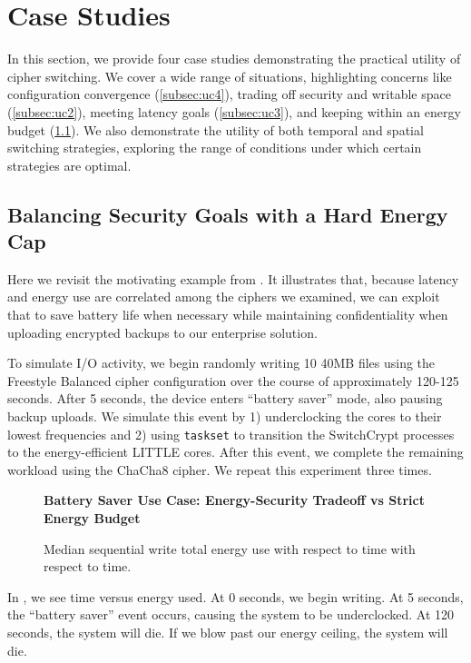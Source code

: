 \section{Case Studies} \label{sec:sc-usecases}

In this section, we provide four case studies demonstrating the practical
utility of cipher switching. We cover a wide range of situations, highlighting
concerns like configuration convergence (\cref{subsec:uc4}), trading off
security and writable space (\cref{subsec:uc2}), meeting latency goals
(\cref{subsec:uc3}), and keeping within an energy budget (\cref{subsec:uc1}). We
also demonstrate the utility of both temporal and spatial switching strategies,
exploring the range of conditions under which certain strategies are optimal.

\subsection{Balancing Security Goals with a Hard Energy Cap} \label{subsec:uc1}

Here we revisit the motivating example from . It illustrates
that, because latency and energy use are correlated among the ciphers we
examined, we can exploit that to save battery life when necessary while
maintaining confidentiality when uploading encrypted backups to our
enterprise solution.

To simulate I/O activity, we begin randomly writing 10 40MB files using the
Freestyle Balanced cipher configuration over the course of approximately 120-125
seconds. After 5 seconds, the device enters ``battery saver'' mode, also pausing
backup uploads. We simulate this event by 1) underclocking the cores to their
lowest frequencies and 2) using \texttt{taskset} to transition the SwitchCrypt
processes to the energy-efficient LITTLE cores. After this event, we complete
the remaining workload using the ChaCha8 cipher. We repeat this experiment three
times.

\begin{figure}[ht] \textbf{Battery Saver Use Case: Energy-Security Tradeoff vs
   Strict Energy Budget}\par\medskip
   \centering
   {} \caption{Median sequential write total
   energy use with respect to time with respect to time.}
  \label{fig:usecase-battery}
\end{figure}

In , we see time versus energy used. At 0 seconds, we
begin writing. At 5 seconds, the ``battery saver'' event occurs, causing the
system to be underclocked. At 120 seconds, the system will die. If we blow past
our energy ceiling, the system will die.

